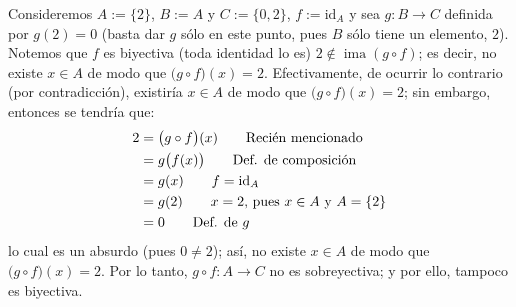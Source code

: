 \documentclass[letterpaper,DIV=14,headsepline,12pt]{scrartcl}
\makeatletter
\newenvironment{solu}[1][]{%
        \par\pushQED{\hfill \lozenge}%
        \normalfont\topsep6pt \partopsep0pt %
        \trivlist
        \item[\hskip\labelsep
                \textbf{\textit{Solución.}}%
        ]#1
        }{%
        \popQED\endtrivlist\@endpefalse
    }
\newcommand{\id}{\mathrm{id}}
\DeclareMathOperator{\ima}{ima}
\makeatother
\begin{document}
\begin{solu}
        Consideremos $A:=\{2\}$, $B:=A$ y $C:=\{0,2\}$, $f:=\id_A$ y sea $g:B \to C$ definida por $g(2)=0$ (basta dar $g$ sólo en este punto, pues $B$ sólo tiene un elemento, $2$). Notemos que $f$ es biyectiva (toda identidad lo es) $2 \notin \ima(g \circ f)$; es decir, no existe $x \in A$ de modo que $\big(g \circ f\big) (x)=2$. Efectivamente, de ocurrir lo contrario (por contradicción), existiría $x \in A$ de modo que $\big(g \circ f\big) (x)=2$; sin embargo, entonces se tendría que:
        \begin{align*}
            2 & = \big(g \circ f\big) (x) \tag*{Recién mencionado} \\
            & = g \big( f(x) \big) \tag*{Def. de composición} \\
            & = g ( x ) \tag*{$f=\id_A$} \\
            & = g (2) \tag*{$x=2$, pues $x \in A$ y $A=\{2\}$} \\
            & = 0 \tag*{Def. de $g$}
        \end{align*}
        lo cual es un absurdo (pues $0 \neq 2$); así, no existe $x \in A$ de modo que $\big(g \circ f\big)(x)=2$. Por lo tanto, $g \circ f:A \to C$ no es sobreyectiva; y por ello, tampoco es biyectiva.
    \end{solu}
\end{document}
